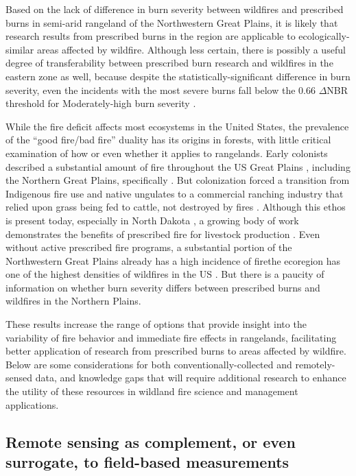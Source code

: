 \documentclass[fire,article,submit,oneauthor,pdftex]{Definitions/mdpi}
\begin{document}
Based on the lack of difference in burn severity between wildfires and prescribed burns in semi-arid rangeland of the Northwestern Great Plains, it is likely that research results from prescribed burns in the region are applicable to ecologically-similar areas affected by wildfire. 
Although less certain, there is possibly a useful degree of transferability between prescribed burn research and wildfires in the eastern zone as well, because despite the statistically-significant difference in burn severity, even the incidents with the most severe burns fall below the 0.66 $\Delta$NBR threshold for Moderately-high burn severity \cite[][Fig.~\ref{Fig:WF_Rx}]{key2006a}.

While the fire deficit affects most ecosystems in the United States, the prevalence of the ``good fire/bad fire'' duality has its origins in forests, with little critical examination of how or even whether it applies to rangelands. 
Early colonists described a substantial amount of fire throughout the US Great Plains \cite{courtwright2007}, including the Northern Great Plains, specifically \cite{higgins1984,umbanhowar1996}. 
But colonization forced a transition from Indigenous fire use and native ungulates to a commercial ranching industry that relied upon grass being fed to cattle, not destroyed by fires \cite{courtwright2007}. 
Although this ethos is present today, especially in North Dakota \cite{boland2025}, a growing body of work demonstrates the benefits of prescribed fire for livestock production \cite{wanchuk2024, spiess2020, wanchuk2024a}. 
Even without active prescribed fire programs, a substantial portion of the Northwestern Great Plains already has a high incidence of fire\textemdash the ecoregion has one of the highest densities of wildfires in the US \cite{mcgranahan2024}. 
But there is a paucity of information on whether burn severity differs between prescribed burns and wildfires in the Northern Plains. 

These results increase the range of options that provide insight into the variability of fire behavior and immediate fire effects in rangelands, facilitating better application of research from prescribed burns to areas affected by wildfire. 
Below are some considerations for both conventionally-collected and remotely-sensed data, and knowledge gaps that will require additional research to enhance the utility of these resources in wildland fire science and management applications.

\subsection{Remote sensing as complement, or even surrogate, to field-based measurements} 
\end{document}
